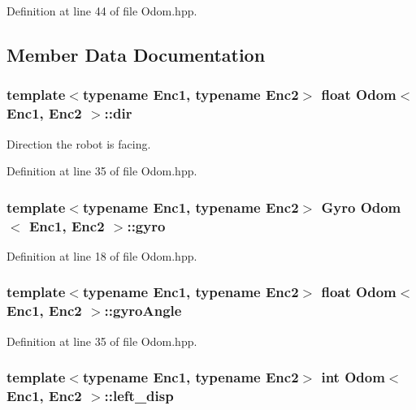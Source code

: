 Definition at line 44 of file Odom.\-hpp.



\subsection{Member Data Documentation}
\hypertarget{classOdom_ad2308d2e662650534d2a85aad6c97349}{
\subsubsection[{dir}]{\setlength{\rightskip}{0pt plus 5cm}template$<$typename Enc1, typename Enc2$>$ float {\bf Odom}$<$ Enc1, Enc2 $>$\-::dir}}\label{classOdom_ad2308d2e662650534d2a85aad6c97349}


Direction the robot is facing. 



Definition at line 35 of file Odom.\-hpp.

\hypertarget{classOdom_a52380c80a1c7072904a766a59e09d3b5}{
\subsubsection[{gyro}]{\setlength{\rightskip}{0pt plus 5cm}template$<$typename Enc1, typename Enc2$>$ {\bf Gyro} {\bf Odom}$<$ Enc1, Enc2 $>$\-::gyro\hspace{0.3cm}{\ttfamily [private]}}}\label{classOdom_a52380c80a1c7072904a766a59e09d3b5}


Definition at line 18 of file Odom.\-hpp.

\hypertarget{classOdom_a4c4c2d005150e15fef0db14e923bfca3}{
\subsubsection[{gyro\-Angle}]{\setlength{\rightskip}{0pt plus 5cm}template$<$typename Enc1, typename Enc2$>$ float {\bf Odom}$<$ Enc1, Enc2 $>$\-::gyro\-Angle}}\label{classOdom_a4c4c2d005150e15fef0db14e923bfca3}


Definition at line 35 of file Odom.\-hpp.

\hypertarget{classOdom_aa29154456ebb189815df2501cc8eb2fd}{
\subsubsection[{left\-\_\-disp}]{\setlength{\rightskip}{0pt plus 5cm}template$<$typename Enc1, typename Enc2$>$ int {\bf Odom}$<$ Enc1, Enc2 $>$\-::left\-\_\-disp}}\label{classOdom_aa29154456ebb189815df2501cc8eb2fd}


